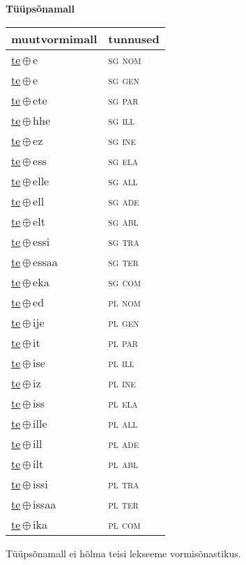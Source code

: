 

\vspace{3.5em}
\noindent \begin{minipage}{\textwidth}
\noindent \textbf{Tüüpsõnamall \,}\\

\begin{sideways}
\begin{tabular}{l l}
muutvormimall & tunnused \\
\hline
\underline{te}\,$\oplus$\,e & \textsc{ sg nom } \\
\underline{te}\,$\oplus$\,e & \textsc{ sg gen } \\
\underline{te}\,$\oplus$\,ete & \textsc{ sg par } \\
\underline{te}\,$\oplus$\,hhe & \textsc{ sg ill } \\
\underline{te}\,$\oplus$\,ez & \textsc{ sg ine } \\
\underline{te}\,$\oplus$\,ess & \textsc{ sg ela } \\
\underline{te}\,$\oplus$\,elle & \textsc{ sg all } \\
\underline{te}\,$\oplus$\,ell & \textsc{ sg ade } \\
\underline{te}\,$\oplus$\,elt & \textsc{ sg abl } \\
\underline{te}\,$\oplus$\,essi & \textsc{ sg tra } \\
\underline{te}\,$\oplus$\,essaa & \textsc{ sg ter } \\
\underline{te}\,$\oplus$\,eka & \textsc{ sg com } \\
\underline{te}\,$\oplus$\,ed & \textsc{ pl nom } \\
\underline{te}\,$\oplus$\,ije & \textsc{ pl gen } \\
\underline{te}\,$\oplus$\,it & \textsc{ pl par } \\
\underline{te}\,$\oplus$\,ise & \textsc{ pl ill } \\
\underline{te}\,$\oplus$\,iz & \textsc{ pl ine } \\
\underline{te}\,$\oplus$\,iss & \textsc{ pl ela } \\
\underline{te}\,$\oplus$\,ille & \textsc{ pl all } \\
\underline{te}\,$\oplus$\,ill & \textsc{ pl ade } \\
\underline{te}\,$\oplus$\,ilt & \textsc{ pl abl } \\
\underline{te}\,$\oplus$\,issi & \textsc{ pl tra } \\
\underline{te}\,$\oplus$\,issaa & \textsc{ pl ter } \\
\underline{te}\,$\oplus$\,ika & \textsc{ pl com } \\
\end{tabular}
\end{sideways}
\label{tab:tüüpsõnamall-tee}

\end{minipage}

 
\vspace{1em}
\noindent Tüüpsõnamall  ei hõlma teisi lekseeme vormi\-sõnastikus.
